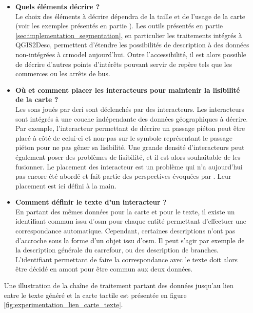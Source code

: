 \begin{itemize}
    \item \textbf{Quels éléments décrire ?} \\
    Le choix des éléments à décrire dépendra de la taille et de l'usage de la carte (voir les exemples présentés en partie \todo{}). Les outils présentés en partie \ref{sec:implementation_segmentation}, en particulier les traitements intégrés à QGIS2Desc, permettent d'étendre les possibilités de description à des données non-intégrées à crmodel aujourd'hui. Outre l'accessibilité, il est alors possible de décrire d'autres points d'intérêts pouvant servir de repère tels que les commerces ou les arrêts de bus.
    \item \textbf{Où et comment placer les interacteurs pour maintenir la lisibilité de la carte ?} \\
    Les sons joués par \gls{deri} sont déclenchés par des interacteurs. Les interacteurs sont intégrés à une couche indépendante des données géographiques à décrire. Par exemple, l'interacteur permettant de décrire un passage piéton peut être placé à côté de celui-ci et non-pas sur le symbole représentant le passage piéton pour ne pas gêner sa lisibilité. Une grande densité d'interacteurs peut également poser des problèmes de lisibilité, et il est alors souhaitable de les fusionner. Le placement des interacteur est un problème qui n'a aujourd'hui pas encore été abordé et fait partie des perspectives évoquées par \cite{Jiang2023}. Leur placement est ici défini à la main.
    \item \textbf{Comment définir le texte d'un interacteur ?} \\
    En partant des mêmes données pour la carte et pour le texte, il existe un identifiant commun issu d'\gls{osm} pour chaque entité  permettant d'effectuer une correspondance automatique. Cependant, certaines descriptions n'ont pas d'accroche sous la forme d'un objet issu d'\gls{osm}. Il peut s'agir par exemple de la description générale du carrefour, ou des description de branches. L'identifiant permettant de faire la correspondance avec le texte doit alors être décidé en amont pour être commun aux deux données.
\end{itemize}

\newpar{}

Une illustration de la chaîne de traitement partant des données jusqu'au lien entre le texte généré et la carte tactile est présentée en figure \ref{fig:experimentation_lien_carte_texte}.

